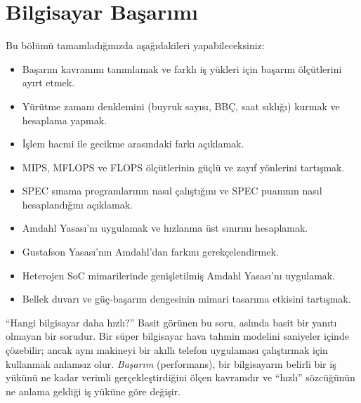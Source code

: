 \chapter{Bilgisayar Başarımı}
\label{chap:basarim}

\begin{tcolorbox}[
    colback=blokyesil!15,
    colframe=sinyalyesil!60!black,
    title={\textbf{Öğrenme Hedefleri}},
    fonttitle=\bfseries,
    rounded corners,
    boxrule=0.8pt
]
Bu bölümü tamamladığınızda aşağıdakileri yapabileceksiniz:
\begin{itemize}[nosep, leftmargin=*]
    \item Başarım kavramını tanımlamak ve farklı iş yükleri için başarım ölçütlerini ayırt etmek.
    \item Yürütme zamanı denklemini (buyruk sayısı, BBÇ, saat sıklığı) kurmak ve hesaplama yapmak.
    \item İşlem hacmi ile gecikme arasındaki farkı açıklamak.
    \item MIPS, MFLOPS ve FLOPS ölçütlerinin güçlü ve zayıf yönlerini tartışmak.
    \item SPEC sınama programlarının nasıl çalıştığını ve SPEC puanının nasıl hesaplandığını açıklamak.
    \item Amdahl Yasası'nı uygulamak ve hızlanma üst sınırını hesaplamak.
    \item Gustafson Yasası'nın Amdahl'dan farkını gerekçelendirmek.
    \item Heterojen SoC mimarilerinde genişletilmiş Amdahl Yasası'nı uygulamak.
    \item Bellek duvarı ve güç-başarım dengesinin mimari tasarıma etkisini tartışmak.
\end{itemize}
\end{tcolorbox}

``Hangi bilgisayar daha hızlı?'' Basit görünen bu soru, aslında basit bir yanıtı olmayan bir sorudur. Bir süper bilgisayar hava tahmin modelini saniyeler içinde çözebilir; ancak aynı makineyi bir akıllı telefon uygulaması çalıştırmak için kullanmak anlamsız olur. \emph{Başarım} (performans), bir bilgisayarın belirli bir iş yükünü ne kadar verimli gerçekleştirdiğini ölçen kavramdır ve ``hızlı'' sözcüğünün ne anlama geldiği iş yüküne göre değişir.

